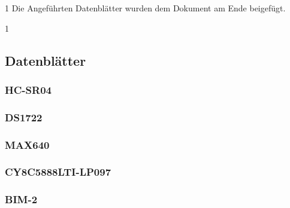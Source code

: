 \documentclass[12pt,a4paper,german]{article}
\def\datasheets{0}
\begin{document}
\if\datasheets1
	Die Angeführten Datenblätter wurden dem Dokument am Ende beigefügt.
\fi

\if\datasheets1
\subsection{Datenblätter}

	\subsubsection{HC-SR04}
	

	\subsubsection{DS1722}
	

	\subsubsection{MAX640}
	

	\subsubsection{CY8C5888LTI-LP097}
	
	
	\subsubsection{BIM-2}
	

\fi %
\end{document}
